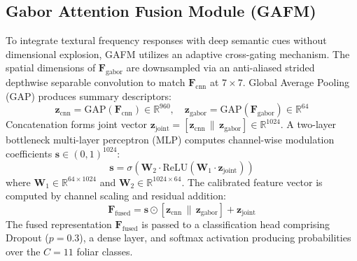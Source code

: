 \documentclass[journal]{IEEEtran}
\begin{document}
\subsection{Gabor Attention Fusion Module (GAFM)}
To integrate textural frequency responses with deep semantic cues without dimensional explosion, GAFM utilizes an adaptive cross-gating mechanism. The spatial dimensions of $\mathbf{F}_{\text{gabor}}$ are downsampled via an anti-aliased strided depthwise separable convolution to match $\mathbf{F}_{\text{cnn}}$ at $7 \times 7$. Global Average Pooling (GAP) produces summary descriptors:
\begin{equation}
    \mathbf{z}_{\text{cnn}} = \text{GAP}(\mathbf{F}_{\text{cnn}}) \in \mathbb{R}^{960}, \quad \mathbf{z}_{\text{gabor}} = \text{GAP}(\mathbf{F}_{\text{gabor}}) \in \mathbb{R}^{64}
\end{equation}
Concatenation forms joint vector $\mathbf{z}_{\text{joint}} = [\mathbf{z}_{\text{cnn}} \,\|\, \mathbf{z}_{\text{gabor}}] \in \mathbb{R}^{1024}$. A two-layer bottleneck multi-layer perceptron (MLP) computes channel-wise modulation coefficients $\mathbf{s} \in (0, 1)^{1024}$:
\begin{equation}
    \mathbf{s} = \sigma\left(\mathbf{W}_2 \cdot \text{ReLU}\left(\mathbf{W}_1 \cdot \mathbf{z}_{\text{joint}}\right)\right)
\end{equation}
where $\mathbf{W}_1 \in \mathbb{R}^{64 \times 1024}$ and $\mathbf{W}_2 \in \mathbb{R}^{1024 \times 64}$. The calibrated feature vector is computed by channel scaling and residual addition:
\begin{equation}
    \mathbf{F}_{\text{fused}} = \mathbf{s} \odot [\mathbf{z}_{\text{cnn}} \,\|\, \mathbf{z}_{\text{gabor}}] + \mathbf{z}_{\text{joint}}
\end{equation}
The fused representation $\mathbf{F}_{\text{fused}}$ is passed to a classification head comprising Dropout ($p = 0.3$), a dense layer, and softmax activation producing probabilities over the $C = 11$ foliar classes.
\end{document}
